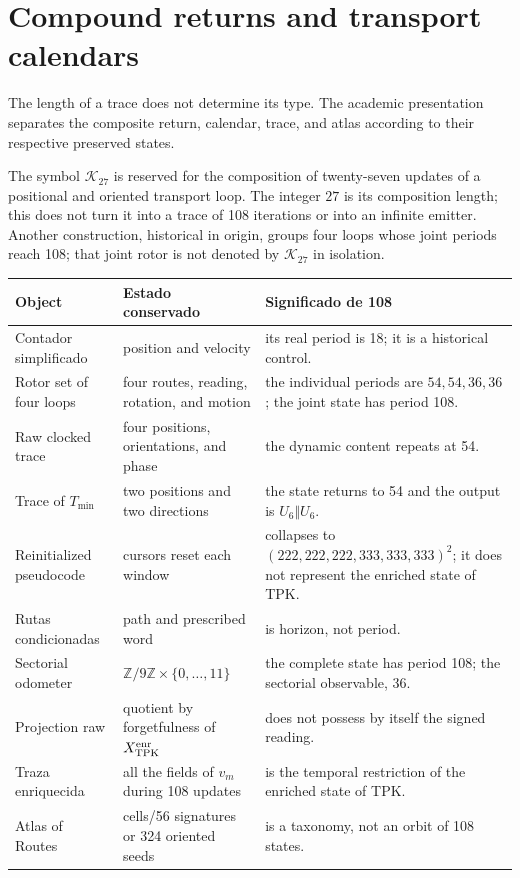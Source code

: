 \section{Compound returns and transport calendars}

The length of a trace does not determine its type. The academic presentation
separates the composite return, calendar, trace, and atlas according to their
respective preserved states.

The symbol \(\mathcal K_{27}\) is reserved for the composition of
twenty-seven updates of a positional and oriented transport loop.
The integer \(27\) is its composition length; this does not turn it into a
trace of 108 iterations or into an infinite emitter. Another construction, historical
in origin, groups four loops whose joint periods reach 108; that joint rotor
is not denoted by \(\mathcal K_{27}\) in isolation.

\begin{longtable}{@{}>{\raggedright\arraybackslash}p{}>{\raggedright\arraybackslash}p{}>{\raggedright\arraybackslash}p{}@{}}
\toprule
Object&Estado conservado&Significado de 108\\\midrule
\endhead
Contador simplificado&position and velocity&its real period is 18; it is a
historical control.\\
Rotor set of four loops&four routes, reading, rotation, and motion&
the individual periods are \(54,54,36,36\); the joint state has
period 108.\\
Raw clocked trace&four positions, orientations, and phase&the dynamic content repeats at 54.\\
Trace of \(T_{\min}\)&two positions and two directions&the state returns to
54 and the output is \(U_6\Vert U_6\).\\
Reinitialized pseudocode&cursors reset each window&collapses to
\((222,222,222,333,333,333)^2\); it does not represent the enriched state of TPK.\\
Rutas condicionadas&path and prescribed word&108 is horizon, not period.\\
Sectorial odometer&\(\mathbb Z/9\mathbb Z\times\{0,\ldots,11\}\)&the
complete state has period 108; the sectorial observable, 36.\\
Projection raw&quotient by forgetfulness of \(X_{\rm TPK}^{\rm enr}\)&does not possess
by itself the signed reading.\\
Traza enriquecida&all the fields of \(v_m\) during 108 updates&is
the temporal restriction of the enriched state of TPK.\\
Atlas of Routes&81 cells/56 signatures or 324 oriented seeds&is a taxonomy,
not an orbit of 108 states.\\
\bottomrule
\end{longtable}

